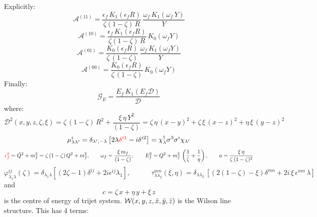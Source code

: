 \documentclass[9pt]{article}
\newcommand{\chg}[1]{{\color{red}#1}}
\numberwithin{equation}{section}
\begin{document}
\label{chg:ty3c}\chg{Explicitly}: 
$$\mathcal{A}^{(11)} = \frac{\epsilon_{f}\,K_{1}(\epsilon_{f} R)}{\zeta(1-\zeta)\,R}\,\frac{\omega_{f}\,K_{1}(\omega_{f}\,Y)}{Y}$$
$$\mathcal{A}^{(10)} = \frac{\epsilon_{f}\,K_{1}(\epsilon_{f}R)}{\zeta(1-\zeta)\,R}\, K_{0}(\omega_{f}Y)$$
$$\mathcal{A}^{(01)} = \frac{K_{0}(\epsilon_{f}R)}{\zeta\,(1-\zeta)}\,\frac{\omega_{f}\,K_{1}(\omega_{f}Y)}{Y}$$
$$\mathcal{A}^{(00)} = \frac{K_{0}(\epsilon_{f}R)}{\zeta\,(1-\zeta)}\,K_{0}(\omega_{f}Y)$$
Finally:
$$\mathcal{G}_{E} = \frac{E_{f}\,K_{1}(E_{f}\mathcal{D})}{\mathcal{D}}$$
where: 
$$\mathcal{D}^{2}(x,y,z,\zeta,\xi) = \zeta\,(1-\zeta)\,R^{2} + \frac{\xi\,\eta\,Y^{2}}{(1-\zeta)} = \zeta\,\eta\,(x-y)^{2} + \zeta\,\xi\,(x-z)^{2} + \eta\,\xi\,(y-z)^{2}$$
\label{chg:dilc}$$\mu^{i}_{\lambda\lambda'} = \delta_{\lambda',-\lambda}\left[2\lambda\chg{\delta^{i1}} - i\delta^{i2}\right] = \chi^{\dagger}_{\lambda}\sigma^{3}\sigma^{i}\chi_{\lambda'}$$
\label{chg:epsdefb}$$\chg{\epsilon^{2}_{f}} = \Tilde{Q}^{2}+ m^{2}_{f} = \zeta\, (1-\zeta)\,Q^{2} +m^{2}_{f}, \hspace{2em} \omega_{f} = \frac{\xi\,m_{f}}{(1-\zeta)}, \hspace{2em} E^{2}_{f} = Q^{2} +m^{2}_{f}\,\left(\frac{1}{\zeta} + \frac{1}{\eta}\right),\hspace{2em} a = \frac{\xi\,\eta}{\zeta\,(1-\zeta)^{2}}$$
$$\varphi^{ij}_{\lambda_{1}\lambda}(\zeta) = \delta_{\lambda_{1}\lambda}\left[(2\zeta -1)\delta^{ij} +2i\epsilon^{ij}\lambda_{1}\right],\hspace{3em} \tau^{mn}_{\lambda \lambda_{2}}(\xi,\eta) = \delta_{\lambda \lambda_{2}}\,\left[(2(1-\zeta)-\xi)\delta^{mn}+2i\,\xi\,\epsilon^{mn}\,\lambda\right] $$
and 
$$c = \zeta\,x +\eta\, y + \xi\,z$$ is the centre of energy of trijet system.
$\mathcal{W}(x,y,z,\Bar{x},\Bar{y},\Bar{z})$ is the Wilson line structure. This has 4 terms:
\end{document}
